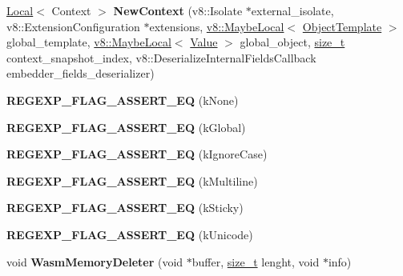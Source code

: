 \begin{DoxyCompactItemize}
\mbox{\hyperlink{classv8_1_1Local}{Local}}$<$ Context $>$ {\bfseries New\+Context} (v8\+::\+Isolate $\ast$external\+\_\+isolate, v8\+::\+Extension\+Configuration $\ast$extensions, \mbox{\hyperlink{classv8_1_1MaybeLocal}{v8\+::\+Maybe\+Local}}$<$ \mbox{\hyperlink{classv8_1_1ObjectTemplate}{Object\+Template}} $>$ global\+\_\+template, \mbox{\hyperlink{classv8_1_1MaybeLocal}{v8\+::\+Maybe\+Local}}$<$ \mbox{\hyperlink{classv8_1_1Value}{Value}} $>$ global\+\_\+object, \mbox{\hyperlink{classsize__t}{size\+\_\+t}} context\+\_\+snapshot\+\_\+index, v8\+::\+Deserialize\+Internal\+Fields\+Callback embedder\+\_\+fields\+\_\+deserializer)
\item 
\mbox{\label{namespacev8_a8a08d76ad777282f9482658235f5209a}} 
{\bfseries R\+E\+G\+E\+X\+P\+\_\+\+F\+L\+A\+G\+\_\+\+A\+S\+S\+E\+R\+T\+\_\+\+EQ} (k\+None)
\item 
\mbox{\label{namespacev8_a8ab96ef7b8a36fa3e069c81c128a6cb7}} 
{\bfseries R\+E\+G\+E\+X\+P\+\_\+\+F\+L\+A\+G\+\_\+\+A\+S\+S\+E\+R\+T\+\_\+\+EQ} (k\+Global)
\item 
\mbox{\label{namespacev8_ac0145e0ba5074b759e96df7a01051cbe}} 
{\bfseries R\+E\+G\+E\+X\+P\+\_\+\+F\+L\+A\+G\+\_\+\+A\+S\+S\+E\+R\+T\+\_\+\+EQ} (k\+Ignore\+Case)
\item 
\mbox{\label{namespacev8_ad7c4bff176fa0251caf22607a9280dd6}} 
{\bfseries R\+E\+G\+E\+X\+P\+\_\+\+F\+L\+A\+G\+\_\+\+A\+S\+S\+E\+R\+T\+\_\+\+EQ} (k\+Multiline)
\item 
\mbox{\label{namespacev8_a671d3cd55030dd0b4b94f6e31441b810}} 
{\bfseries R\+E\+G\+E\+X\+P\+\_\+\+F\+L\+A\+G\+\_\+\+A\+S\+S\+E\+R\+T\+\_\+\+EQ} (k\+Sticky)
\item 
\mbox{\label{namespacev8_a443c7f18c53e23476315c3fe7b57bb4d}} 
{\bfseries R\+E\+G\+E\+X\+P\+\_\+\+F\+L\+A\+G\+\_\+\+A\+S\+S\+E\+R\+T\+\_\+\+EQ} (k\+Unicode)
\item 
\mbox{\label{namespacev8_a2cc9f0809dfc9a52eda57fac3fc45e50}} 
void {\bfseries Wasm\+Memory\+Deleter} (void $\ast$buffer, \mbox{\hyperlink{classsize__t}{size\+\_\+t}} lenght, void $\ast$info)
\item 
\mbox{\label{namespacev8_abc068a9a09ed557f0dee870387a1011f}} 

\end{DoxyCompactItemize}
